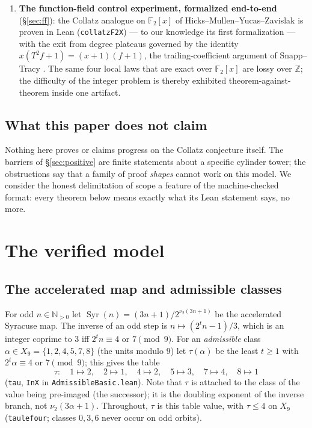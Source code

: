 \documentclass[11pt]{amsart}
\theoremstyle{definition}
\theoremstyle{remark}
\newcommand{\Syr}{\operatorname{Syr}}
\newcommand{\lean}[1]{{\def\_{\textunderscore\allowbreak}\texttt{#1}}}
\newcommand{\F}{\mathbb{F}}
\newcommand{\N}{\mathbb{N}}
\newcommand{\Z}{\mathbb{Z}}
\newcommand{\nutwo}{\nu_2}
\begin{document}
\begin{enumerate}
{  corridor} valid without any cycle hypothesis; and Eliahou's
  continued-fraction reduction \cite{Eliahou1993} --- the elementary core of
  the Simons--de~Weger--Hercher programme --- with kernel-checked instances
  (Syracuse periods $<359$ from verification up to $2^{20}$; periods
  $<16\,266$ from $2^{29}$), connected to the literature's verification
  statements by an explicit bridge.
\item \textbf{The function-field control experiment, formalized end-to-end}
  (\S\ref{sec:ff}): the Collatz analogue on $\F_2[x]$ of
  Hicks--Mullen--Yucas--Zavislak \cite{HMYZ2008} is proven in Lean
  (\lean{collatz\_F2X}) --- to our knowledge its first formalization ---
  with the exit from degree plateaus governed by the identity
  $x(T^{2}f+1) = (x+1)(f+1)$, the trailing-coefficient argument of
  Snapp--Tracy \cite{SnappTracy2008}.  The same four local laws that are
  exact over $\F_2[x]$ are lossy over $\Z$; the difficulty of the integer
  problem is thereby exhibited theorem-against-theorem inside one artifact.
\end{enumerate}

\subsection*{What this paper does not claim}
Nothing here proves or claims progress on the Collatz conjecture itself.
The barriers of \S\ref{sec:positive} are finite statements about a specific
cylinder tower; the obstructions say that a family of proof \emph{shapes}
cannot work on this model.  We consider the honest delimitation of scope a
feature of the machine-checked format: every theorem below means exactly
what its Lean statement says, no more.

\section{The verified model}\label{sec:model}

\subsection{The accelerated map and admissible classes}
For odd $n \in \N_{>0}$ let
$\Syr(n) = (3n+1)/2^{\nutwo(3n+1)}$ be the accelerated Syracuse map.  The
inverse of an odd step is $n \mapsto (2^{t}n-1)/3$, which is an integer
coprime to $3$ iff $2^{t}n \equiv 4$ or $7 \pmod 9$.  For an
\emph{admissible} class $\alpha \in X_9 = \{1,2,4,5,7,8\}$ (the units modulo
$9$) let $\tau(\alpha)$ be the least $t \ge 1$ with $2^{t}\alpha \equiv 4$
or $7 \pmod 9$; this gives the table
\[
\tau:\quad 1 \mapsto 2,\quad 2 \mapsto 1,\quad 4 \mapsto 2,\quad
5 \mapsto 3,\quad 7 \mapsto 4,\quad 8 \mapsto 1
\]
(\lean{tau}, \lean{InX} in \lean{AdmissibleBasic.lean}).  Note that $\tau$
is attached to the class of the value being pre-imaged (the successor); it
is the doubling exponent of the inverse branch, not $\nutwo(3\alpha+1)$.
Throughout, $\tau$ is this table value, with $\tau \le 4$ on $X_9$
(\lean{tau\_le\_four}; classes $0,3,6$ never occur on odd orbits).
\end{document}
